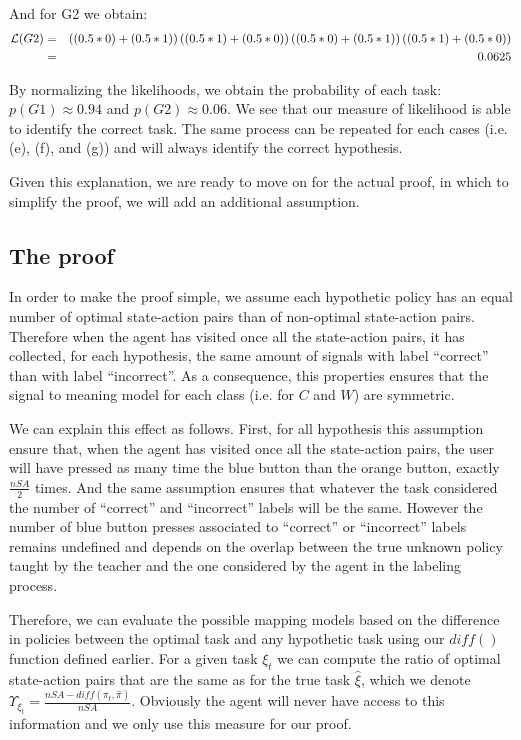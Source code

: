 And for G2 we obtain:
%
\begin{eqnarray}
\mathcal{L}(G2) &=& \left((0.5*0)+(0.5*1)\right)\left((0.5*1)+(0.5*0)\right)\left((0.5*0)+(0.5*1)\right)\left((0.5*1)+(0.5*0)\right) \nonumber \\
&=& 0.0625 \nonumber
\end{eqnarray}

By normalizing the likelihoods, we obtain the probability of each task: $p(G1) \approx 0.94$ and $p(G2) \approx 0.06$. We see that our measure of likelihood is able to identify the correct task. The same process can be repeated for each cases (i.e. (e), (f), and (g)) and will always identify the correct hypothesis. 

Given this explanation, we are ready to move on for the actual proof, in which to simplify the proof, we will add an additional assumption.

\subsection{The proof}

In order to make the proof simple, we assume each hypothetic policy has an equal number of optimal state-action pairs than of non-optimal state-action pairs. Therefore when the agent has visited once all the state-action pairs, it has collected, for each hypothesis, the same amount of signals with label ``correct'' than with label ``incorrect''. As a consequence, this properties ensures that the signal to meaning model for each class (i.e. for $C$ and $W$) are symmetric. 

We can explain this effect as follows. First, for all hypothesis this assumption ensure that, when the agent has visited once all the state-action pairs, the user will have pressed as many time the blue button than the orange button, exactly $\frac{nSA}{2}$ times. And the same assumption ensures that whatever the task considered the number of ``correct'' and ``incorrect'' labels will be the same. However the number of blue button presses associated to ``correct'' or ``incorrect'' labels remains undefined and depends on the overlap between the true unknown policy taught by the teacher and the one considered by the agent in the labeling process. 

Therefore, we can evaluate the possible mapping models based on the difference in policies between the optimal task and any hypothetic task using our $diff()$ function defined earlier. For a given task $\xi_t$ we can compute the ratio of optimal state-action pairs that are the same as for the true task $\hat{\xi}$, which we denote $\Upsilon_{\xi_t} = \frac{nSA - diff(\pi_t, \hat{\pi})}{nSA}$. Obviously the agent will never have access to this information and we only use this measure for our proof.

